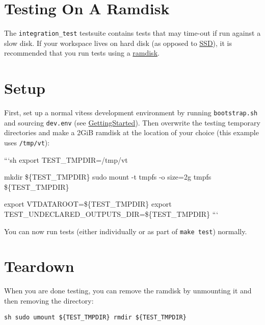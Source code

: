 \section{Testing On A Ramdisk}\hypertarget{testing-on-a-ramdisk}{}\label{testing-on-a-ramdisk}

The {\tt integration\_test} testsuite contains tests that may time-out if run against a slow disk. If your workspace lives on hard disk (as opposed to \href{http://en.wikipedia.org/wiki/Solid-state\_drive}{SSD}), it is recommended that you run tests using a \href{http://en.wikipedia.org/wiki/RAM\_drive}{ramdisk}.

\section{Setup}\hypertarget{setup}{}\label{setup}

First, set up a normal vitess development environment by running {\tt bootstrap.sh} and sourcing {\tt dev.env} (see \href{GettingStarted.markdown}{GettingStarted}). Then overwrite the testing temporary directories and make a 2GiB ramdisk at the location of your choice (this example uses {\tt /tmp/vt}):

```sh
export TEST\_TMPDIR=/tmp/vt

mkdir \$\{TEST\_TMPDIR\}
sudo mount -t tmpfs -o size=2g tmpfs \$\{TEST\_TMPDIR\}

export VTDATAROOT=\$\{TEST\_TMPDIR\}
export TEST\_UNDECLARED\_OUTPUTS\_DIR=\$\{TEST\_TMPDIR\}
```

You can now run tests (either individually or as part of {\tt make test}) normally.

\section{Teardown}\hypertarget{teardown}{}\label{teardown}

When you are done testing, you can remove the ramdisk by unmounting it and then removing the directory:

{\tt sh
sudo umount \$\{TEST\_TMPDIR\}
rmdir \$\{TEST\_TMPDIR\}
}


